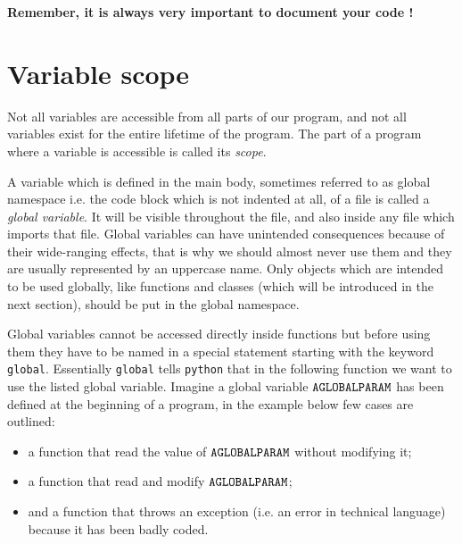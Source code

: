 \textbf{Remember, it is always very important to document your code !}

\section{Variable scope}\label{advanced---variable-scope}

Not all variables are accessible from all parts of our program, and not all variables exist for the entire lifetime of the program. The part of a program where a variable is accessible is called its \emph{scope}.

A variable which is defined in the main body, sometimes referred to as global namespace i.e. the code block which is not indented at all, of a file is called a \emph{global variable}. It will be visible throughout the file, and also inside any file which imports that file. Global variables can have unintended consequences because of their wide-ranging effects, that is why we should almost never use them and they are usually represented by an uppercase name. Only objects which are intended to be used globally, like functions and classes (which will be introduced in the next section), should be put in the global namespace.

Global variables cannot be accessed directly inside functions but before using them they have to be named in a special statement starting with the keyword \texttt{global}. Essentially \texttt{global} tells \texttt{python} that in the following function we want to use the listed global variable.
Imagine a global variable $\tt{AGLOBALPARAM}$ has been defined at the beginning of a program, in the example below few cases are outlined:
\begin {itemize}
\item a function that read the value of $\tt{AGLOBALPARAM}$ without modifying it;
\item a function that read and modify $\tt{AGLOBALPARAM}$;
\item and a function that throws an exception (i.e. an error in technical language) because it has been badly coded.
\end{itemize}

